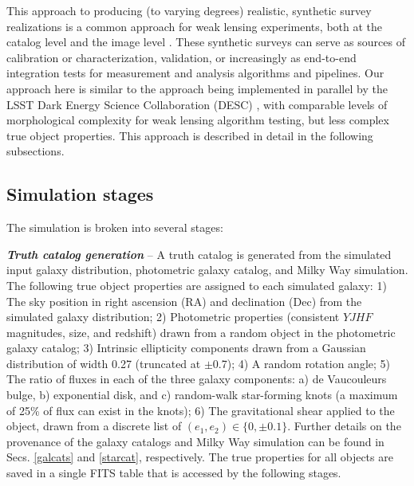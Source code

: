 \documentclass[aps,prd, amsmath,amssymb,superscriptaddress,showkeys,nofootinbib,reprint,preprintnumbers]{revtex4-1}
\begin{document}
This approach to producing (to varying degrees) realistic, synthetic survey realizations is a common approach for weak lensing experiments, both at the catalog level \cite{2018MNRAS.480.4614M,2019arXiv190706530K} and the image level \cite{2016MNRAS.457..786S,2018MNRAS.475.4524S,2017MNRAS.467.1627F,2018MNRAS.481.3170M}. These synthetic surveys can serve as sources of calibration or characterization, validation, or increasingly as end-to-end integration tests for measurement and analysis algorithms and pipelines. Our approach here is similar to the approach being implemented in parallel by the LSST Dark Energy Science Collaboration (DESC) \cite{2019arXiv190706530K}, with comparable levels of morphological complexity for weak lensing algorithm testing, but less complex true object properties. This approach is described in detail in the following subsections.

\subsection{Simulation stages}\label{stages}

The simulation is broken into several stages:

\textbf{\textit{Truth catalog generation}} -- A truth catalog is generated from the simulated input galaxy distribution, photometric galaxy catalog, and Milky Way simulation. 
The following true object properties are assigned to each simulated galaxy:
1) The sky position in right ascension (RA) and declination (Dec) from the simulated galaxy distribution; 
2) Photometric properties (consistent $YJHF$ magnitudes, size, and redshift) drawn from a random object in the photometric galaxy catalog; 
3) Intrinsic ellipticity components drawn from a Gaussian distribution of width 0.27 (truncated at $\pm$0.7); 
4) A random rotation angle; 
5) The ratio of fluxes in each of the three galaxy components: a) de Vaucouleurs bulge, b) exponential disk, and c) random-walk star-forming knots (a maximum of 25\% of flux can exist in the knots); 
6) The gravitational shear applied to the object, drawn from a discrete list of $(e_1, e_2) \in \{0,\pm 0.1\}$.
Further details on the provenance of the galaxy catalogs and Milky Way simulation can be found in Secs. \ref{galcats} and \ref{starcat}, respectively. 
The true properties for all objects are saved in a single FITS table that is accessed by the following stages.
\end{document}
